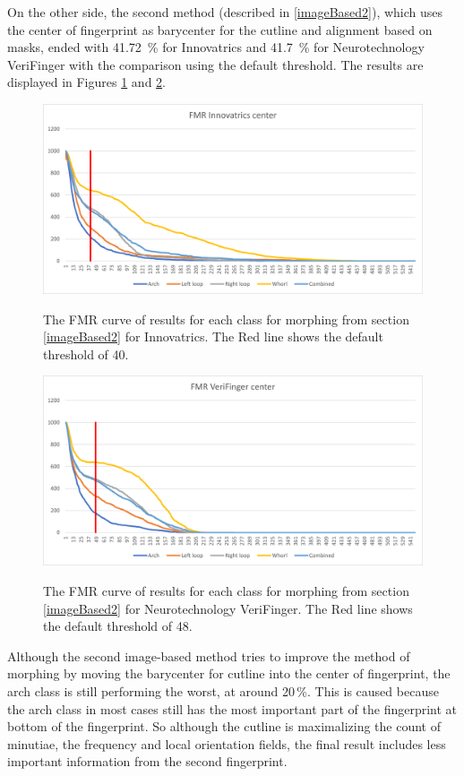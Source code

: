 On the other side, the second method (described in \ref{imageBased2}), which uses the center of fingerprint as barycenter for the cutline and alignment based on masks, ended with 41.72 \,\% for Innovatrics and 41.7 \,\% for Neurotechnology VeriFinger with the comparison using the default threshold. The results are displayed in Figures \ref{fig:grapf_center} and \ref{fig:grapf_center_veri}.

\begin{figure}[H]
    \centering
        {\includegraphics[width=0.8\linewidth]{obrazky-figures/results_center.png}}\\
        \caption{The FMR curve of results for each class for morphing from section \ref{imageBased2} for Innovatrics. The Red line shows the default threshold of 40.}
        \label{fig:grapf_center}
\end{figure}

\begin{figure}[H]
    \centering
        {\includegraphics[width=0.8\linewidth]{obrazky-figures/results_center_veri.png}}\\
        \caption{The FMR curve of results for each class for morphing from section \ref{imageBased2} for Neurotechnology VeriFinger. The Red line shows the default threshold of 48.}
        \label{fig:grapf_center_veri}
\end{figure}

Although the second image-based method tries to improve the method of morphing by moving the barycenter for cutline into the center of fingerprint, the arch class is still performing the worst, at around 20\,\%. This is caused because the arch class in most cases still has the most important part of the fingerprint at bottom of the fingerprint. So although the cutline is maximalizing the count of minutiae, the frequency and local orientation fields, the final result includes less important information from the second fingerprint. 


